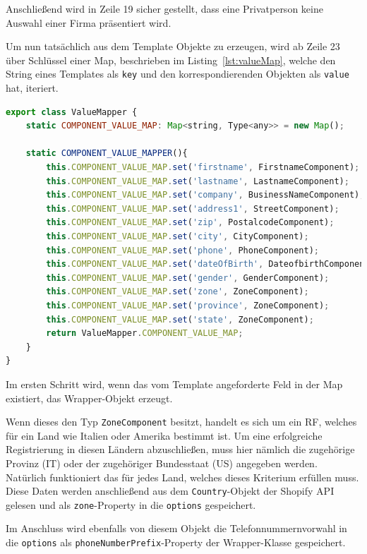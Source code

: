 Anschließend wird in Zeile 19 sicher gestellt, dass eine Privatperson keine Auswahl einer Firma präsentiert wird.

Um nun tatsächlich aus dem Template Objekte zu erzeugen, wird ab Zeile 23 über Schlüssel einer Map, beschrieben im Listing~\ref{lst:valueMap}, welche den String eines Templates als \texttt{key} und den korrespondierenden Objekten als \texttt{value} hat, iteriert. 

\begin{lstlisting}[caption={valueMap in der \texttt{analyzeRow()}-Methode},captionpos=b, language=JavaScript,label={lst:valueMap}]
export class ValueMapper {
	static COMPONENT_VALUE_MAP: Map<string, Type<any>> = new Map();
	
	static COMPONENT_VALUE_MAPPER(){
		this.COMPONENT_VALUE_MAP.set('firstname', FirstnameComponent);
		this.COMPONENT_VALUE_MAP.set('lastname', LastnameComponent);
		this.COMPONENT_VALUE_MAP.set('company', BusinessNameComponent);
		this.COMPONENT_VALUE_MAP.set('address1', StreetComponent);
		this.COMPONENT_VALUE_MAP.set('zip', PostalcodeComponent);
		this.COMPONENT_VALUE_MAP.set('city', CityComponent);
		this.COMPONENT_VALUE_MAP.set('phone', PhoneComponent);
		this.COMPONENT_VALUE_MAP.set('dateOfBirth', DateofbirthComponent);
		this.COMPONENT_VALUE_MAP.set('gender', GenderComponent);
		this.COMPONENT_VALUE_MAP.set('zone', ZoneComponent);
		this.COMPONENT_VALUE_MAP.set('province', ZoneComponent);
		this.COMPONENT_VALUE_MAP.set('state', ZoneComponent);
		return ValueMapper.COMPONENT_VALUE_MAP;
	}
}
\end{lstlisting}

Im ersten Schritt wird, wenn das vom Template angeforderte Feld in der Map existiert, das Wrapper-Objekt erzeugt. 

Wenn dieses den Typ \texttt{ZoneComponent} besitzt, handelt es sich um ein RF, welches für ein Land wie Italien oder Amerika bestimmt ist. Um eine erfolgreiche Registrierung in diesen Ländern abzuschließen, muss hier nämlich die zugehörige Provinz (IT) oder der zugehöriger Bundesstaat (US) angegeben werden. Natürlich funktioniert das für jedes Land, welches dieses Kriterium erfüllen muss. Diese Daten werden anschließend aus dem \texttt{Country}-Objekt der Shopify API gelesen und als \texttt{zone}-Property in die \texttt{options} gespeichert. 

Im Anschluss wird ebenfalls von diesem Objekt die Telefonnummernvorwahl in die \texttt{options} als \texttt{phoneNumberPrefix}-Property der Wrapper-Klasse gespeichert.

